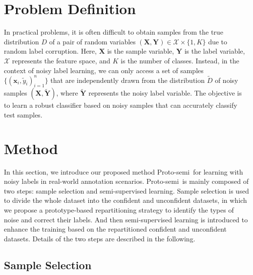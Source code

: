 \documentclass[letterpaper]{article} %
\newcommand{\method}{Proto-semi}
\begin{document}
\section{Problem Definition}




In practical problems, it is often difficult to obtain samples from the true distribution $D$ of a pair of random variables $(\bm{X}, \bm{Y})\in\mathcal{X}\times \{1,K\}$ due to random label corruption. Here, $\bm{X}$ is the sample variable, $\bm{Y}$ is the label variable, $\mathcal{X}$ represents the feature space, and $K$ is the number of classes. Instead, in the context of noisy label learning, we can only access a set of samples $\{{({\bm{x}_{i}, \tilde{y}_{i}})_{i = 1}^{n}}\}$ that are independently drawn from the distribution $\tilde{D}$ of noisy samples $(\bm{X}, \bm{\tilde{Y}})$, where $\bm{\tilde{Y}}$ represents the noisy label variable. The objective is to learn a robust classifier based on noisy samples that can accurately classify test samples.

\section{Method}
In this section, we introduce our proposed method \method\ for learning with noisy labels in real-world annotation scenarios. \method\ is mainly composed of two steps: sample selection and semi-supervised learning. Sample selection is used to divide the whole dataset into the confident and unconfident datasets, in which we propose a prototype-based repartitioning strategy to identify the types of noise and correct their labels. And then semi-supervised learning is introduced to enhance the training based on the repartitioned confident and unconfident datasets. Details of the two steps are described in the following.

\subsection{Sample Selection}
\end{document}
